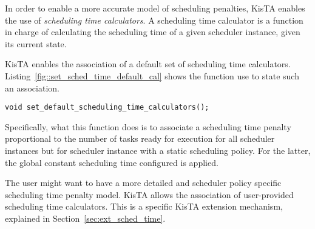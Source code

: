 In order to enable a more accurate model of scheduling penalties,
KisTA enables the use of \emph{scheduling time calculators}.
%
A scheduling time calculator is a function in charge of calculating
the scheduling time of a given scheduler instance, given its current
state.

KisTA enables the association of a default set of scheduling time calculators.
Listing~\ref{fig::set_sched_time_default_cal} shows the function use to state such an association.
\begin{lstlisting}[style=KistaCodeStyle,caption={API for setting user specific constant scheduling times.},label=fig::set_sched_time_default_cal]
void set_default_scheduling_time_calculators();
\end{lstlisting}
Specifically, what this function does is to associate a scheduling time penalty proportional to the number of tasks ready
for execution for all scheduler instances but for scheduler instance with a static scheduling policy.
For the latter, the global constant scheduling time configured is applied.

The user might want to have a more detailed and scheduler policy specific scheduling time penalty model.
KisTA allows the association of user-provided  scheduling time calculators.
This is a specific KisTA extension mechanism, explained in Section~\ref{sec:ext_sched_time}.

